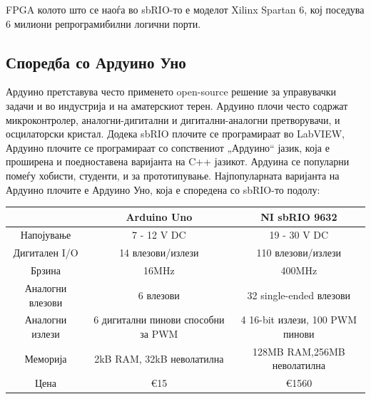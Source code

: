 \documentclass{article}
\begin{document}
FPGA колото што се наоѓа во sbRIO-то е моделот Xilinx Spartan 6, кој поседува 6 милиони репрограмибилни логични порти.
\subsection{Споредба со Ардуино Уно}
Ардуино претставува често применето open-source решение за управувачки задачи и во индустрија и на аматерскиот терен. Ардуино плочи често содржат микроконтролер, аналогни-дигитални и дигитални-аналогни претворувачи, и осцилаторски кристал. Додека sbRIO плочите се програмираат во LabVIEW, Ардуино плочите се програмираат со сопствениот „Ардуино“ јазик, која е проширена и поедноставена варијанта на C++ јазикот. Ардуина се популарни помеѓу хобисти, студенти, и за прототипување. Најпопуларната варијанта на Ардуино плочите е Ардуино Уно, која е споредена со sbRIO-то подолу:    
\begin{center}
\begin{tabular}{||c|c|c||}
\hline
  & Arduino Uno & NI sbRIO 9632 \\ [0.75ex]
\hline \hline
Напојување & 7 - 12 V DC & 19 - 30 V DC \\
\hline 
Дигитален I/O & 14 влезови/излези & 110 влезови/излези \\
\hline
Брзина & 16MHz & 400MHz \\
\hline
Аналогни влезови & 6 влезови & 32 single-ended влезови \\
\hline
Аналогни излези & 6 дигитални пинови способни за PWM & 4 16-bit излези, 100 PWM пинови \\
\hline
Меморија & 2kB RAM, 32kB неволатилна & 128MB RAM,256MB неволатилна \\ 
\hline
Цена & €15 & €1560 \\ [0.5ex]
\hline
\end{tabular}
\end{center}
\end{document}
